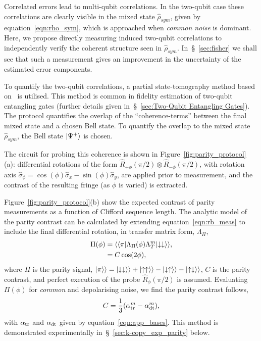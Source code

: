 Correlated errors lead to multi-qubit correlations. In the two-qubit case these correlations are clearly visible in the mixed state $\hat\rho_{sym}$, 
given by equation~\ref{eqn:rho_sym}, which is approached when \emph{common noise} is dominant. 
Here, we propose directly measuring induced two-qubit correlations to independently verify the coherent structure seen in $\hat\rho_{sym}$. 
In~\S~\ref{sec:fisher} we shall see that such a measurement gives an improvement in the uncertainty of the estimated error components. 

To quantify the two-qubit correlations, a partial state-tomography method based on~\cite{sackett_experimental_2000} is utilised. This method is common in fidelity estimation of two-qubit entangling gates (further details given in~\S~\ref{sec:Two-Qubit Entangling Gates}).
The protocol quantifies the overlap of the ``coherence-terms'' between the final mixed state and a chosen Bell state. To quantify the overlap to the mixed state $\hat\rho_{sym}$, the Bell state $\ket{\Psi^+}$ is chosen.

The circuit for probing this coherence is shown in Figure~\ref{fig:parity_protocol} (a): differential rotations of the form $\hat R_{+\phi}(\pi/2) \otimes
\hat R_{-\phi}(\pi/2)$, with rotation axis $\hat\sigma_\phi=\cos(\phi)\hat\sigma_x - \sin(\phi)\hat\sigma_y$, are applied prior to measurement, and the contrast of the
resulting fringe (as $\phi$ is varied) is extracted. 

Figure~\ref{fig:parity_protocol}(b) show the expected contrast of parity measurements as a function of Clifford sequence length. The analytic model of the parity contrast can be calculated by extending equation~\ref{eqn:rb_meas} to include the final differential rotation, in transfer matrix form, $\Lambda_\Pi$,
\begin{equation}\label{eqn:app_parcontrast}
\begin{split}
    \Pi(\phi)&=\langle\langle \pi\lvert\Lambda_\Pi(\phi)\Lambda_T^m\lvert\downarrow\downarrow\rangle\rangle,\\
    &= C\cos(2\phi),
\end{split}
\end{equation}
where $\Pi$ is the parity signal, $\lvert\pi\rangle\rangle=\lvert\downarrow\downarrow\rangle\rangle+\lvert\uparrow\uparrow\rangle\rangle-\lvert\downarrow\uparrow\rangle\rangle-\lvert\uparrow\downarrow\rangle\rangle$, $C$ is the parity contrast, and perfect execution of the probe $\hat R_\phi(\pi/2)$ is assumed.
Evaluating $\Pi(\phi)$ for \emph{common} and depolarising noise, we find the parity contrast follows,
\begin{equation}\label{eqn:parity_contrast}
    C=\frac{1}{3}(\alpha_{\rm tr}^m-\alpha_{\rm dt}^m),
\end{equation}
with $\alpha_{\rm tr}$ and $\alpha_{\rm dt}$ given by equation~\ref{eqn:app_bases}.
This method is demonstrated experimentally in~\S~\ref{sec:k-copy_exp_parity} below.


